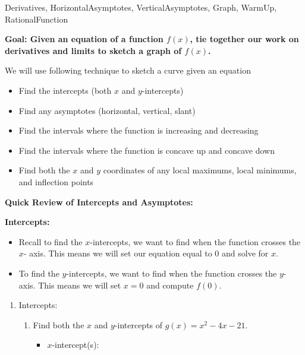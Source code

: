
\begin{tagblock}{Derivatives, HorizontalAsymptotes, VerticalAsymptotes, Graph, WarmUp, RationalFunction  }
\begin{question}

\textbf{Goal:  Given an equation of a function $f(x)$, tie together our work on derivatives and limits to sketch a graph of $f(x)$.}

\bigskip

We will use following technique to sketch a curve given an equation
\begin{itemize}
\item Find the intercepts (both $x$ and $y$-intercepts)
\item Find any asymptotes (horizontal, vertical, slant)
\item Find the intervals where the function is increasing and decreasing
\item Find the intervals where the function is concave up and concave down
\item Find both the $x$ and $y$ coordinates of any local maximums, local minimums, and inflection points
\end{itemize}


\bigskip


\textbf{Quick Review of Intercepts and Asymptotes:}

\bigskip

\textbf{Intercepts:}
\begin{itemize}
\item Recall to find the $x$-intercepts, we want to find when the function crosses the $x$- axis.  This means we will set our equation equal to $0$ and solve for $x$.
\item To find the $y$-intercepts, we want to find when the function crosses the $y$- axis.  This means we will set $x=0$ and compute $f(0)$.
\end{itemize}

\begin{enumerate}  
\item Intercepts:
\begin{enumerate}
\item Find both the $x$ and $y$-intercepts of $g(x) = x^2-4x -21$.  
\begin{itemize}
\item $x$-intercept(s):  
\vspace{.5in}





\end{itemize}
\end{enumerate}
\end{enumerate}
\end{question}
\end{tagblock}

